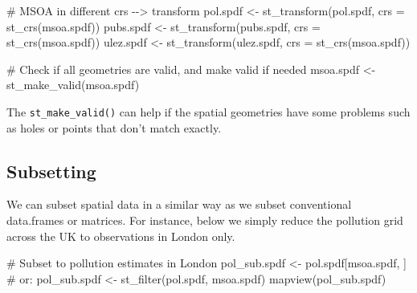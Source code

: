 \documentclass[
  letterpaper,
  DIV=11,
  numbers=noendperiod]{scrreprt}
\newenvironment{Shaded}{\begin{snugshade}}{\end{snugshade}}
\newcommand{\AttributeTok}[1]{\textcolor[rgb]{0.40,0.45,0.13}{#1}}
\newcommand{\CommentTok}[1]{\textcolor[rgb]{0.37,0.37,0.37}{#1}}
\newcommand{\FunctionTok}[1]{\textcolor[rgb]{0.28,0.35,0.67}{#1}}
\newcommand{\NormalTok}[1]{\textcolor[rgb]{0.00,0.23,0.31}{#1}}
\newcommand{\OtherTok}[1]{\textcolor[rgb]{0.00,0.23,0.31}{#1}}
\begin{document}
\begin{Shaded}
\begin{Highlighting}[]
\CommentTok{\# MSOA in different crs {-}{-}\textgreater{} transform}
\NormalTok{pol.spdf }\OtherTok{\textless{}{-}} \FunctionTok{st\_transform}\NormalTok{(pol.spdf, }\AttributeTok{crs =} \FunctionTok{st\_crs}\NormalTok{(msoa.spdf))}
\NormalTok{pubs.spdf }\OtherTok{\textless{}{-}} \FunctionTok{st\_transform}\NormalTok{(pubs.spdf, }\AttributeTok{crs =} \FunctionTok{st\_crs}\NormalTok{(msoa.spdf))}
\NormalTok{ulez.spdf }\OtherTok{\textless{}{-}} \FunctionTok{st\_transform}\NormalTok{(ulez.spdf, }\AttributeTok{crs =} \FunctionTok{st\_crs}\NormalTok{(msoa.spdf))}


\CommentTok{\# Check if all geometries are valid, and make valid if needed}
\NormalTok{msoa.spdf }\OtherTok{\textless{}{-}} \FunctionTok{st\_make\_valid}\NormalTok{(msoa.spdf)}
\end{Highlighting}
\end{Shaded}

The \texttt{st\_make\_valid()} can help if the spatial geometries have
some problems such as holes or points that don't match exactly.

\hypertarget{subsetting}{%
\subsection{Subsetting}\label{subsetting}}

We can subset spatial data in a similar way as we subset conventional
data.frames or matrices. For instance, below we simply reduce the
pollution grid across the UK to observations in London only.

\begin{Shaded}
\begin{Highlighting}[]
\CommentTok{\# Subset to pollution estimates in London}
\NormalTok{pol\_sub.spdf }\OtherTok{\textless{}{-}}\NormalTok{ pol.spdf[msoa.spdf, ] }\CommentTok{\# or:}
\NormalTok{pol\_sub.spdf }\OtherTok{\textless{}{-}} \FunctionTok{st\_filter}\NormalTok{(pol.spdf, msoa.spdf)}
\FunctionTok{mapview}\NormalTok{(pol\_sub.spdf)}
\end{Highlighting}
\end{Shaded}
\end{document}
